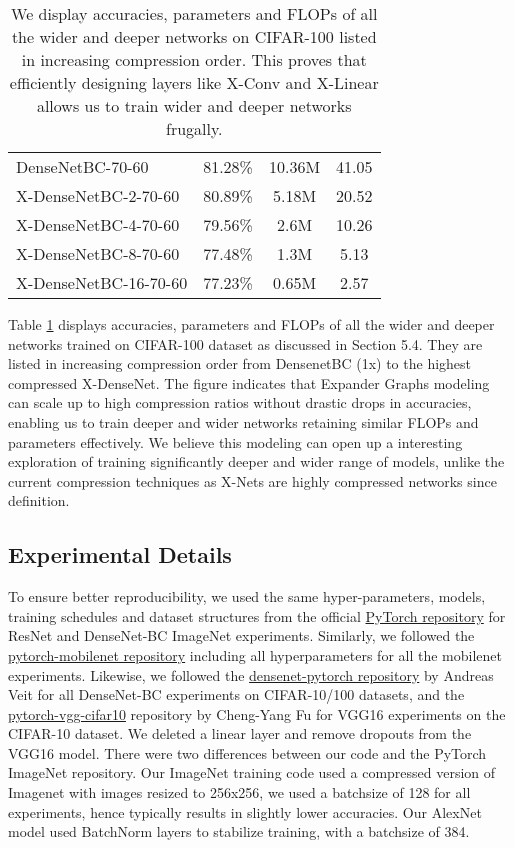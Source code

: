 \begin{table}[!tbh]
{\begin{tabular}{|l|c|c|c|}
\hline
DenseNetBC-70-60 & 81.28\% & 10.36M & 41.05\\
X-DenseNetBC-2-70-60 & 80.89\% & 5.18M & 20.52\\
X-DenseNetBC-4-70-60 & 79.56\% & 2.6M & 10.26\\
X-DenseNetBC-8-70-60 & 77.48\% & 1.3M & 5.13\\
X-DenseNetBC-16-70-60 & 77.23\% & 0.65M & 2.57\\
\hline
\end{tabular}}
\caption{We display accuracies, parameters and FLOPs of all the wider and deeper networks on CIFAR-100 listed in increasing compression order. This proves that efficiently designing layers like X-Conv and X-Linear allows us to train wider and deeper networks frugally.}
\label{tab:ultranets}
\end{table}

\noindent Table \ref{tab:ultranets} displays accuracies, parameters and FLOPs of all the wider and deeper networks trained on CIFAR-100 dataset as discussed in Section 5.4. They are listed in increasing compression order from DensenetBC (1x) to the highest compressed X-DenseNet. The figure indicates that Expander Graphs modeling can scale up to high compression ratios without drastic drops in accuracies, enabling us to train deeper and wider networks retaining similar FLOPs and parameters effectively. We believe this modeling can open up a interesting exploration of training significantly deeper and wider range of models, unlike the current compression techniques as X-Nets are highly compressed networks since definition. 

\subsection{Experimental Details}
\label{sec:expdetails}
\noindent To ensure better reproducibility, we used the same hyper-parameters, models, training schedules and dataset structures from the official \href{https://github.com/pytorch/examples/blob/master/imagenet/main.py}{PyTorch repository} for ResNet and DenseNet-BC ImageNet experiments. Similarly, we followed the \href{https://github.com/marvis/pytorch-mobilenet}{pytorch-mobilenet repository} including all hyperparameters for all the mobilenet experiments. Likewise, we followed the \href{https://github.com/andreasveit/densenet-pytorch/}{densenet-pytorch repository} by Andreas Veit for all DenseNet-BC experiments on CIFAR-10/100 datasets, and the \href{https://github.com/chengyangfu/pytorch-vgg-cifar10}{pytorch-vgg-cifar10} repository by Cheng-Yang Fu for VGG16 experiments on the CIFAR-10 dataset. We deleted a linear layer and remove dropouts from the VGG16 model. There were two differences between our code and the PyTorch ImageNet repository. Our ImageNet training code used a compressed version of Imagenet with images resized to 256x256, we used a batchsize of 128 for all experiments, hence typically results in slightly lower accuracies. Our AlexNet model used BatchNorm layers to stabilize training, with a batchsize of 384.\\

